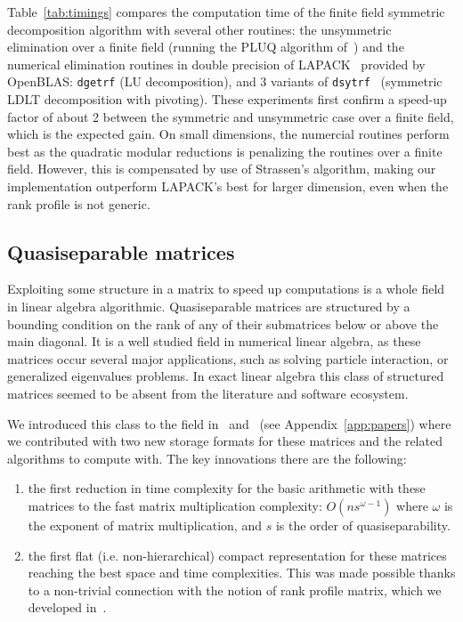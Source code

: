 \documentclass{deliverablereport}
\begin{document}
Table~\ref{tab:timings} compares the computation time of the finite field symmetric
decomposition algorithm with several other routines: the unsymmetric elimination
over a finite field (running the PLUQ algorithm of~\cite{jgd:2017:bruhat}) and the
numerical elimination routines in double precision of LAPACK~\cite{LAPACK99}
provided by OpenBLAS: \texttt{dgetrf} (LU decomposition), and 3 variants of
\texttt{dsytrf}~\cite{lawn294} (symmetric LDLT decomposition with pivoting). 
These experiments first confirm a speed-up factor
of about 2 between the symmetric and unsymmetric case over a finite field, which
is the expected gain. 
On small dimensions, the numercial routines perform best as the
quadratic modular reductions is penalizing the routines over a finite
field. However, this is compensated by use of Strassen's algorithm, making our
implementation outperform  LAPACK's best \dsytrf for larger dimension, even when
the rank profile is not generic.

\subsection{Quasiseparable matrices}

Exploiting some structure in a matrix to speed up computations is a whole field
in linear algebra algorithmic. Quasiseparable matrices are  structured by a
bounding condition on the rank of any of their submatrices below or above
the main diagonal. It is a well studied field in numerical linear algebra, as
these matrices occur several major applications, such as solving particle
interaction, or generalized eigenvalues problems.
In exact linear algebra this class of structured matrices seemed to be absent
from the literature and software ecosystem.

We introduced this class to the field in~\cite{Per16} and~\cite{PeSt18} (see Appendix~\ref{app:papers}) where we
contributed with two new storage formats for these matrices and the related algorithms
to compute with. The key innovations there are the following:
\begin{enumerate}
\item the first reduction in time complexity for the basic arithmetic with these
  matrices to the fast matrix multiplication complexity: $O(ns^{\omega-1})$
  where $\omega$ is the exponent of matrix multiplication, and $s$ is the order
  of quasiseparability.
\item the first flat (i.e. non-hierarchical) compact representation for these
  matrices reaching the best space and time complexities. This was made possible
  thanks to a non-trivial connection with the notion of rank profile matrix,
  which we developed in~\cite{DPS17}.
\end{enumerate}
\end{document}
